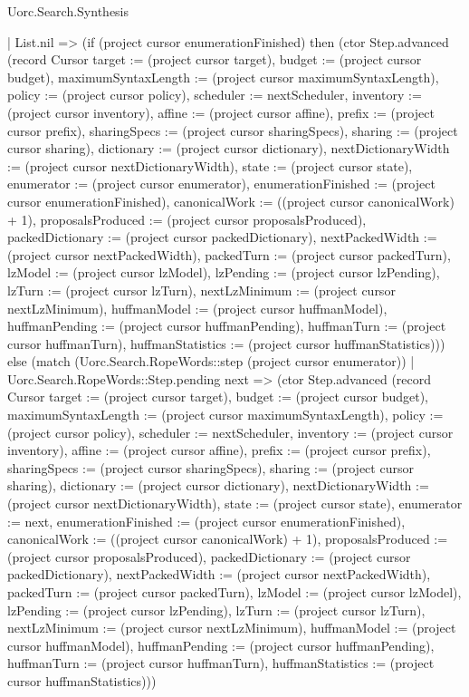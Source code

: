 \begin{lexlean}{Uorc.Search.Synthesis}
\begin{semanticmodule}
{      | List.nil => (if (project cursor enumerationFinished) then (ctor Step.advanced (record Cursor {target := (project cursor target), budget := (project cursor budget), maximumSyntaxLength := (project cursor maximumSyntaxLength), policy := (project cursor policy), scheduler := nextScheduler, inventory := (project cursor inventory), affine := (project cursor affine), prefix := (project cursor prefix), sharingSpecs := (project cursor sharingSpecs), sharing := (project cursor sharing), dictionary := (project cursor dictionary), nextDictionaryWidth := (project cursor nextDictionaryWidth), state := (project cursor state), enumerator := (project cursor enumerator), enumerationFinished := (project cursor enumerationFinished), canonicalWork := ((project cursor canonicalWork) + 1), proposalsProduced := (project cursor proposalsProduced), packedDictionary := (project cursor packedDictionary), nextPackedWidth := (project cursor nextPackedWidth), packedTurn := (project cursor packedTurn), lzModel := (project cursor lzModel), lzPending := (project cursor lzPending), lzTurn := (project cursor lzTurn), nextLzMinimum := (project cursor nextLzMinimum), huffmanModel := (project cursor huffmanModel), huffmanPending := (project cursor huffmanPending), huffmanTurn := (project cursor huffmanTurn), huffmanStatistics := (project cursor huffmanStatistics)})) else (match (Uorc.Search.RopeWords::step (project cursor enumerator))
        | Uorc.Search.RopeWords::Step.pending next => (ctor Step.advanced (record Cursor {target := (project cursor target), budget := (project cursor budget), maximumSyntaxLength := (project cursor maximumSyntaxLength), policy := (project cursor policy), scheduler := nextScheduler, inventory := (project cursor inventory), affine := (project cursor affine), prefix := (project cursor prefix), sharingSpecs := (project cursor sharingSpecs), sharing := (project cursor sharing), dictionary := (project cursor dictionary), nextDictionaryWidth := (project cursor nextDictionaryWidth), state := (project cursor state), enumerator := next, enumerationFinished := (project cursor enumerationFinished), canonicalWork := ((project cursor canonicalWork) + 1), proposalsProduced := (project cursor proposalsProduced), packedDictionary := (project cursor packedDictionary), nextPackedWidth := (project cursor nextPackedWidth), packedTurn := (project cursor packedTurn), lzModel := (project cursor lzModel), lzPending := (project cursor lzPending), lzTurn := (project cursor lzTurn), nextLzMinimum := (project cursor nextLzMinimum), huffmanModel := (project cursor huffmanModel), huffmanPending := (project cursor huffmanPending), huffmanTurn := (project cursor huffmanTurn), huffmanStatistics := (project cursor huffmanStatistics)}))
}
\end{semanticmodule}
\end{lexlean}
